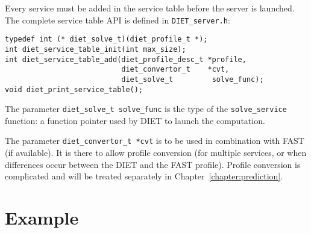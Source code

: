 Every service must be added in the service table before the server is
launched. The complete service table API is defined in \texttt{DIET\_server.h}:
{\footnotesize
\begin{verbatim}
typedef int (* diet_solve_t)(diet_profile_t *);
int diet_service_table_init(int max_size);
int diet_service_table_add(diet_profile_desc_t *profile,
                           diet_convertor_t    *cvt,
                           diet_solve_t         solve_func);
void diet_print_service_table();
\end{verbatim}
}

The parameter \texttt{diet\_solve\_t solve\_func} is the type of the
\texttt{solve\_service} function: a function pointer used by DIET to launch the
computation.

The parameter \texttt{diet\_convertor\_t *cvt} is to be used in combination
with FAST (if available). It is there to allow profile conversion (for
multiple services, or when differences occur between the DIET and the FAST
profile). Profile conversion is complicated and will be treated
separately in Chapter~\ref{chapter:prediction}.

\section{Example}
\label{sec:sv_ex}

